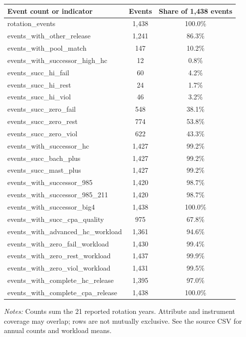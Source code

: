 \documentclass[10pt]{article}
\begin{document}
\begin{minipage}{19cm}\fontsize{10}{12}\selectfont\setlength{\tabcolsep}{4pt}\renewcommand{\arraystretch}{1.12}


\centering
{}
\begin{threeparttable}
\begin{tabular}{p{}cc}
\toprule
Event count or indicator & Events & Share of 1,438 events \\
\midrule
rotation\_events & 1,438 & 100.0\% \\
events\_with\_other\_release & 1,241 & 86.3\% \\
events\_with\_pool\_match & 147 & 10.2\% \\
events\_with\_successor\_high\_hc & 12 & 0.8\% \\
events\_succ\_hi\_fail & 60 & 4.2\% \\
events\_succ\_hi\_rest & 24 & 1.7\% \\
events\_succ\_hi\_viol & 46 & 3.2\% \\
events\_succ\_zero\_fail & 548 & 38.1\% \\
events\_succ\_zero\_rest & 774 & 53.8\% \\
events\_succ\_zero\_viol & 622 & 43.3\% \\
events\_with\_successor\_hc & 1,427 & 99.2\% \\
events\_succ\_bach\_plus & 1,427 & 99.2\% \\
events\_succ\_mast\_plus & 1,427 & 99.2\% \\
events\_with\_successor\_985 & 1,420 & 98.7\% \\
events\_with\_successor\_985\_211 & 1,420 & 98.7\% \\
events\_with\_successor\_big4 & 1,438 & 100.0\% \\
events\_with\_succ\_cpa\_quality & 975 & 67.8\% \\
events\_with\_advanced\_hc\_workload & 1,361 & 94.6\% \\
events\_with\_zero\_fail\_workload & 1,430 & 99.4\% \\
events\_with\_zero\_rest\_workload & 1,437 & 99.9\% \\
events\_with\_zero\_viol\_workload & 1,431 & 99.5\% \\
events\_with\_complete\_hc\_release & 1,395 & 97.0\% \\
events\_with\_complete\_cpa\_release & 1,438 & 100.0\% \\
\bottomrule
\end{tabular}
\begin{tablenotes}\fontsize{9}{11}\selectfont
\item \raggedright \fontsize{9}{11}\selectfont \textit{Notes:} Counts sum the 21 reported rotation years. Attribute and instrument coverage may overlap; rows are not mutually exclusive. See the source CSV for annual counts and workload means.
\end{tablenotes}
\end{threeparttable}

\end{minipage}
\end{document}
